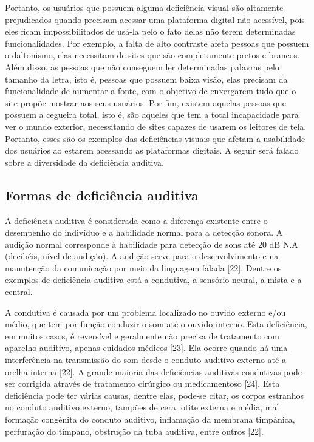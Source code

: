 \documentclass[a4paper]{article}
\begin{document}
\begin{titlepage}
Portanto, os usuários que possuem alguma deficiência visual são altamente prejudicados quando precisam acessar uma plataforma digital não acessível, pois eles ficam impossibilitados de usá-la pelo o fato delas não terem determinadas funcionalidades. Por exemplo, a falta de alto contraste afeta pessoas que possuem o daltonismo, elas necessitam de sites que são completamente pretos e brancos. Além disso, as pessoas que não conseguem ler determinadas palavras pelo tamanho da letra, isto é, pessoas que possuem baixa visão, elas precisam da funcionalidade de aumentar a fonte, com o objetivo de enxergarem tudo que o site propõe mostrar aos seus usuários. Por fim, existem aquelas pessoas que possuem a cegueira total, isto é, são aqueles que tem a total incapacidade para ver o mundo exterior, necessitando de sites capazes de usarem os leitores de tela. Portanto, esses são os exemplos das deficiências visuais que afetam a usabilidade dos usuários ao estarem acessando as plataformas digitais. A seguir será falado sobre a diversidade da deficiência auditiva.

\subsection{Formas de deficiência auditiva}
A deficiência auditiva é considerada como a diferença existente entre o desempenho do indivíduo e a habilidade normal para a detecção sonora. A audição normal corresponde à habilidade para detecção de sons até 20 dB N.A (decibéis, nível de audição). A audição serve para o desenvolvimento e na manutenção da comunicação por meio da linguagem falada [22]. Dentre os exemplos de deficiência auditiva está a condutiva, a sensório neural, a mista e a central.

A condutiva é causada por um problema localizado no ouvido externo e/ou médio, que tem por função conduzir o som até o ouvido interno. Esta deficiência, em muitos casos, é reversível e geralmente não precisa de tratamento com aparelho auditivo, apenas cuidados médicos [23]. Ela ocorre quando há uma interferência na transmissão do som desde o conduto auditivo externo até a orelha interna [22]. A grande maioria das deficiências auditivas condutivas pode ser corrigida através de tratamento cirúrgico ou medicamentoso [24]. Esta deficiência pode ter várias causas, dentre elas, pode-se citar, os corpos estranhos no conduto auditivo externo, tampões de cera, otite externa e média, mal formação congênita do conduto auditivo, inflamação da membrana timpânica, perfuração do tímpano, obstrução da tuba auditiva, entre outros [22].


\end{titlepage}
\end{document}
